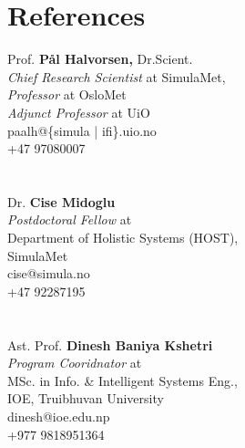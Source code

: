 \documentclass{resumex}
\begin{document}
\section{References}
\begin{center}

\begin{multicols}{3}

Prof. \textbf{Pål Halvorsen,} Dr.Scient. \\
\small{\textit{Chief Research Scientist}} at SimulaMet,\\
\textit{Professor} at OsloMet \\
\textit{Adjunct Professor }at UiO\\
paalh@\{simula | ifi\}.uio.no \\
+47 97080007  \\~\\~\\


Dr. \textbf{Cise Midoglu} \\
\textit{Postdoctoral Fellow }at \\
\small{Department of Holistic Systems (HOST)}, \\
SimulaMet \\
cise@simula.no \\
+47 92287195   \\~\\~\\

Ast. Prof. \textbf{Dinesh Baniya Kshetri} \\
\textit{Program Cooridnator }at \\
\small{MSc. in Info. \& Intelligent Systems Eng.}, \\
IOE, Truibhuvan University \\
dinesh@ioe.edu.np \\
+977 9818951364 \\~\\~\\

\end{multicols}
    
\end{center}

\par\vfill\hfill{} 
\clearpage
% 
\end{document}
